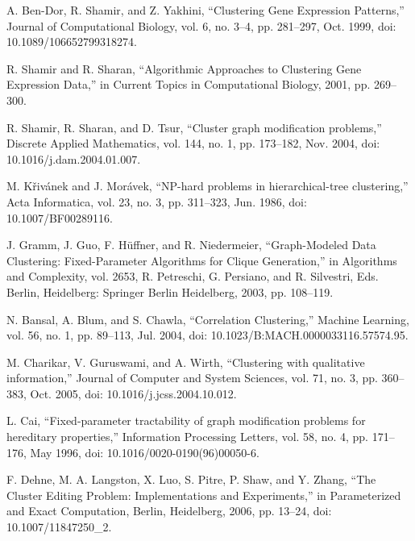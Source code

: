 \documentclass{article}
\begin{document}
\begin{thebibliography}{99}


A. Ben-Dor, R. Shamir, and Z. Yakhini, “Clustering Gene Expression Patterns,” Journal of
Computational Biology, vol. 6, no. 3–4, pp. 281–297, Oct. 1999, doi: 10.1089/106652799318274.

R. Shamir and R. Sharan, “Algorithmic Approaches to Clustering Gene Expression Data,” in Current
Topics in Computational Biology, 2001, pp. 269–300.

R. Shamir, R. Sharan, and D. Tsur, “Cluster graph modification problems,” Discrete Applied
Mathematics, vol. 144, no. 1, pp. 173–182, Nov. 2004, doi: 10.1016/j.dam.2004.01.007.

M. Křivánek and J. Morávek, “NP-hard problems in hierarchical-tree clustering,” Acta Informatica,
vol. 23, no. 3, pp. 311–323, Jun. 1986, doi: 10.1007/BF00289116.

J. Gramm, J. Guo, F. Hüffner, and R. Niedermeier, “Graph-Modeled Data Clustering: Fixed-Parameter
Algorithms for Clique Generation,” in Algorithms and Complexity, vol. 2653, R. Petreschi, G.
Persiano, and R. Silvestri, Eds. Berlin, Heidelberg: Springer Berlin Heidelberg, 2003, pp. 108–119.

N. Bansal, A. Blum, and S. Chawla, “Correlation Clustering,” Machine Learning, vol. 56, no. 1,
pp. 89–113, Jul. 2004, doi: 10.1023/B:MACH.0000033116.57574.95.

M. Charikar, V. Guruswami, and A. Wirth, “Clustering with qualitative information,” Journal of
Computer and System Sciences, vol. 71, no. 3, pp. 360–383, Oct. 2005, doi:
10.1016/j.jcss.2004.10.012.

L. Cai, “Fixed-parameter tractability of graph modification problems for hereditary properties,”
Information Processing Letters, vol. 58, no. 4, pp. 171–176, May 1996, doi:
10.1016/0020-0190(96)00050-6.

F. Dehne, M. A. Langston, X. Luo, S. Pitre, P. Shaw, and Y. Zhang, “The Cluster Editing Problem:
Implementations and Experiments,” in Parameterized and Exact Computation, Berlin, Heidelberg, 2006,
pp. 13–24, doi: 10.1007/11847250\_2.


\end{thebibliography}
\end{document}
